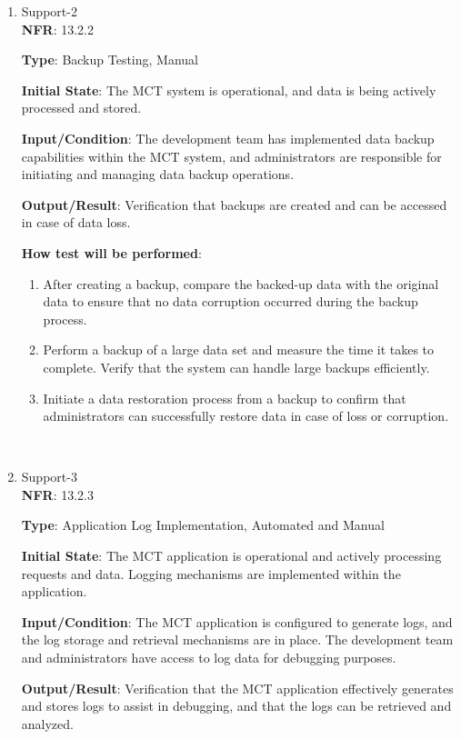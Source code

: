 \documentclass[12pt, titlepage]{article}
\begin{document}
\begin{enumerate}
\\
 
    \item {Support-2\\}
\textbf{NFR}: 13.2.2

\textbf{Type}: Backup Testing, Manual

\textbf{Initial State}: The MCT system is operational, and data is being actively processed and stored.

\textbf{Input/Condition}: The development team has implemented data backup capabilities within the MCT system, and administrators are responsible for initiating and managing data backup operations.

\textbf{Output/Result}: Verification that backups are created and can be accessed in case of data loss.

\textbf{How test will be performed}: 
\begin{enumerate}
    \item After creating a backup, compare the backed-up data with the original data to ensure that no data corruption occurred during the backup process.
    \item  Perform a backup of a large data set and measure the time it takes to complete. Verify that the system can handle large backups efficiently.
    \item Initiate a data restoration process from a backup to confirm that administrators can successfully restore data in case of loss or corruption.
\end{enumerate}

\\

 
    \item {Support-3\\}
\textbf{NFR}: 13.2.3

\textbf{Type}: Application Log Implementation, Automated and Manual

\textbf{Initial State}: The MCT application is operational and actively processing requests and data. Logging mechanisms are implemented within the application.

\textbf{Input/Condition}: The MCT application is configured to generate logs, and the log storage and retrieval mechanisms are in place. The development team and administrators have access to log data for debugging purposes.

\textbf{Output/Result}: Verification that the MCT application effectively generates and stores logs to assist in debugging, and that the logs can be retrieved and analyzed.


\end{enumerate}
\end{document}
